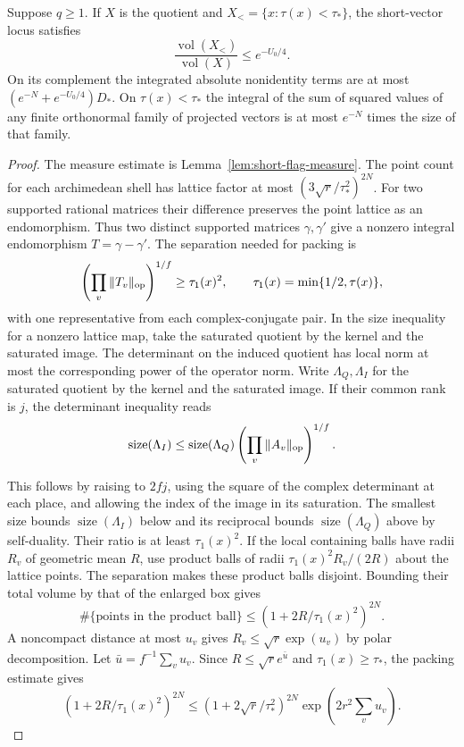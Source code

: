 \begin{lemma}\label{lem:diagonal-integral-bounds}
Suppose \(q\ge1\). If \(X\) is the quotient and \(X_{<}=\{x:\tau(x)<\tau_*\}\), the short-vector locus satisfies 
\[
 \frac{\operatorname{vol}(X_{<})}{\operatorname{vol}(X)}\le e^{-U_0/4}.
\]
 On its complement the integrated
absolute nonidentity terms are at most
\((e^{-N}+e^{-U_0/4})D_*\). On \(\tau(x)<\tau_*\) the integral of
the sum of squared values of any finite orthonormal family of
projected vectors is at most \(e^{-N}\) times the size of that family.
\end{lemma}

\begin{proof}
The measure estimate is Lemma~\ref{lem:short-flag-measure}.
  The point count for each archimedean shell has lattice factor
  at most \((3\sqrt r/\tau_*^2)^{2N}\).
  For two supported rational matrices their difference
  preserves the point lattice as an endomorphism. Thus two distinct supported matrices \(\gamma,\gamma'\) give a nonzero integral endomorphism \(T=\gamma-\gamma'\). The separation needed for packing is 
\[
 \left(\prod_v\|T_v\|_{\rm op}\right)^{1/f}\ge\tau_1(x)^2,\qquad \tau_1(x)=\min\{1/2,\tau(x)\},
\]
 with one representative from each complex-conjugate pair.
  In the size inequality for a nonzero lattice map, take
  the saturated quotient by the kernel and the saturated
  image. The determinant on the induced quotient has
  local norm at most the corresponding power of the
  operator norm. Write \(\Lambda_Q,\Lambda_I\) for the saturated quotient by
  the kernel and the saturated image. If their common rank
  is \(j\), the determinant inequality reads
  \[
   \operatorname{size}(\Lambda_I)
   \le \operatorname{size}(\Lambda_Q)
             \left(\prod_v\|A_v\|_{\rm op}\right)^{1/f}.
  \]

This follows by raising to \(2fj\), using the square of the
  complex determinant at each place, and allowing the index
  of the image in its saturation. The smallest size
  bounds \(\operatorname{size}(\Lambda_I)\) below and its
  reciprocal bounds \(\operatorname{size}(\Lambda_Q)\) above
  by self-duality. Their ratio is at least \(\tau_1(x)^2\).
  If the local containing balls have radii \(R_v\) of
  geometric mean \(R\), use product balls of radii
  \(\tau_1(x)^2 R_v/(2R)\) about the lattice points.
  The separation makes these product balls disjoint. Bounding their
total volume by that of the enlarged box gives
\[
    \#\{\text{points in the product ball}\}
       \le (1+2R/\tau_1(x)^2)^{2N}.
\]
  A noncompact distance at most \(u_v\) gives
  \(R_v\le\sqrt r\exp(u_v)\) by polar decomposition.
  Let \(\bar u=f^{-1}\sum_v u_v\). Since \(R\le\sqrt r e^{\bar u}\)
and \(\tau_1(x)\ge\tau_*\), the packing estimate gives
\[
 (1+2R/\tau_1(x)^2)^{2N}
 \le(1+2\sqrt r/\tau_*^2)^{2N}\exp(2r^2\textstyle\sum_v u_v).
\]


\end{proof}
